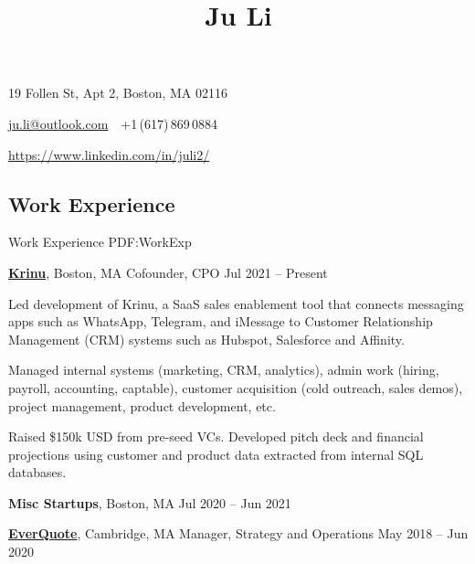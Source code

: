 \documentclass[letterpaper,10pt,oneside]{article}
\newcommand{\CVAuthor}{Ju Li}
\begin{document}

\title{\CVAuthor}

\begin{subtitle}
\vspace{0.7em}
19 Follen St, Apt 2, Boston, MA 02116
\par
\href{mailto:ju.li@outlook.com}
{ju.li@outlook.com}
\,\SubBulletSymbol\,
+1\,(617)\,869\,0884
\par 
\href{https://www.linkedin.com/in/juli2/}{https://www.linkedin.com/in/juli2/}
\end{subtitle}

\begin{body}


\section
{Work\newline
Experience}
{Work Experience}
{PDF:WorkExp}

\href{https://krinu.com/}
{\textbf{Krinu}},
Boston, MA
\GapNoBreak
Cofounder, CPO
\hfill
Jul 2021 -- Present
\begin{flushleft}

\BulletItem Led development of Krinu, a SaaS sales enablement tool that connects messaging apps such as WhatsApp, Telegram, and iMessage to Customer Relationship Management (CRM) systems such as Hubspot, Salesforce and Affinity. 

\vspace{0.3em} \BulletItem Managed internal systems (marketing, CRM, analytics), admin work (hiring, payroll, accounting, captable), customer acquisition (cold outreach, sales demos), project management, product development, etc.

\vspace{0.3em}
\BulletItem Raised \$150k USD from pre-seed VCs. Developed pitch deck and financial projections using customer and product data extracted from internal SQL databases. 

\end{flushleft}

\textbf{Misc Startups},
Boston, MA
\hfill
Jul 2020 -- Jun 2021


\vspace{0.5em}\href{http://www.everquote.com/}
{\textbf{EverQuote}},
Cambridge, MA
\GapNoBreak
Manager, Strategy and Operations
\hfill
May 2018 -- Jun 2020
\begin{flushleft}



\end{flushleft}
\end{body}
\end{document}
